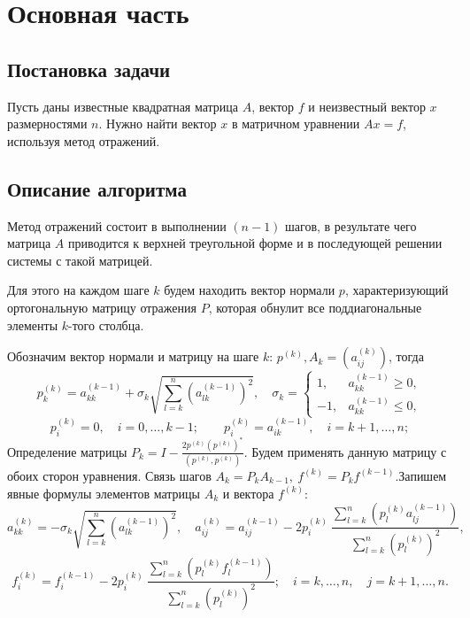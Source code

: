 \section{Основная часть}
    \subsection{Постановка задачи}
        Пусть даны известные квадратная матрица $A$, вектор $f$ и неизвестный вектор $x$ размерностями $n$. Нужно найти вектор $x$ в матричном уравнении $Ax = f$, используя метод отражений.
        
    \subsection{Описание алгоритма}
        Метод отражений состоит в выполнении $(n-1)$ шагов, в результате чего матрица $A$ приводится к верхней треугольной форме и в последующей решении системы с такой матрицей.

        Для этого на каждом шаге $k$ будем находить вектор нормали $p$, характеризующий ортогональную матрицу отражения $P$, которая обнулит все поддиагональные элементы $k$-того столбца.

        Обозначим вектор нормали и матрицу на шаге $k$: $p^{(k)}, A_{k} = \left( a_{ij}^{(k)} \right)$, тогда
        \[
            p_k^{(k)} = a_{kk}^{(k-1)} + \sigma_k \sqrt{\sum_{l=k}^{n} \left( a_{lk}^{(k-1)} \right)^2 }, \quad \sigma_k = \left\{
                \begin{matrix}
                    1, & a_{kk}^{(k-1)} \geq 0, \\
                    -1, & a_{kk}^{(k-1)} \leq 0,
                \end{matrix}
            \right.
        \]
        \[
            p_i^{(k)} = 0, \quad i = 0, \dots, k - 1; \qquad p_i^{(k)} = a_{ik}^{(k-1)} , \quad i = k+1, \dots, n;
        \]
        Определение матрицы $ P_k = I - \frac{2 p^{(k)} \left(p^{(k)}\right)^*}{(p^{(k)},p^{(k)})}$. Будем применять данную матрицу с обоих сторон уравнения. Связь шагов $ A_k = P_k A_{k-1},~ f^{(k)} = P_k f^{(k-1)} $.Запишем явные формулы элементов матрицы $ A_k $ и вектора $ f^{(k)} $:
        \[
            a_{kk}^{(k)} = - \sigma_k \sqrt{\sum_{l=k}^{n} \left( a_{lk}^{(k-1)} \right)^2 }, \quad
            a_{ij}^{(k)} = a_{ij}^{(k-1)} - 2 p_i^{(k)} ~\frac{\sum\limits_{l=k}^{n} \left( p_l^{(k)} a_{lj}^{(k-1)} \right)}{\sum\limits_{l=k}^{n} \left( p_{l}^{(k)} \right)^2},
        \]
        \[
            f_i^{(k)} = f_i^{(k-1)} - 2 p_i^{(k)} ~\frac{\sum\limits_{l=k}^{n} \left( p_l^{(k)} f_l^{(k-1)} \right)}{\sum\limits_{l=k}^{n} \left( p_{l}^{(k)} \right)^2}; \quad
            i = k, \dots, n, \quad j = k+1, \dots, n.
        \]


